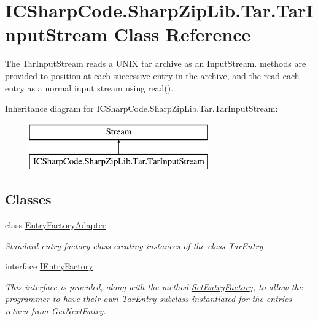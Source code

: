 \hypertarget{class_i_c_sharp_code_1_1_sharp_zip_lib_1_1_tar_1_1_tar_input_stream}{}\section{I\+C\+Sharp\+Code.\+Sharp\+Zip\+Lib.\+Tar.\+Tar\+Input\+Stream Class Reference}
\label{class_i_c_sharp_code_1_1_sharp_zip_lib_1_1_tar_1_1_tar_input_stream}


The \hyperlink{class_i_c_sharp_code_1_1_sharp_zip_lib_1_1_tar_1_1_tar_input_stream}{Tar\+Input\+Stream} reads a U\+N\+IX tar archive as an Input\+Stream. methods are provided to position at each successive entry in the archive, and the read each entry as a normal input stream using read().  


Inheritance diagram for I\+C\+Sharp\+Code.\+Sharp\+Zip\+Lib.\+Tar.\+Tar\+Input\+Stream\+:\begin{figure}[H]
\begin{center}
\leavevmode
\includegraphics[height=2.000000cm]{class_i_c_sharp_code_1_1_sharp_zip_lib_1_1_tar_1_1_tar_input_stream}
\end{center}
\end{figure}
\subsection*{Classes}
\begin{DoxyCompactItemize}
\item 
class \hyperlink{class_i_c_sharp_code_1_1_sharp_zip_lib_1_1_tar_1_1_tar_input_stream_1_1_entry_factory_adapter}{Entry\+Factory\+Adapter}
\begin{DoxyCompactList}\small\item\em Standard entry factory class creating instances of the class \hyperlink{class_i_c_sharp_code_1_1_sharp_zip_lib_1_1_tar_1_1_tar_entry}{Tar\+Entry} \end{DoxyCompactList}\item 
interface \hyperlink{interface_i_c_sharp_code_1_1_sharp_zip_lib_1_1_tar_1_1_tar_input_stream_1_1_i_entry_factory}{I\+Entry\+Factory}
\begin{DoxyCompactList}\small\item\em This interface is provided, along with the method \hyperlink{class_i_c_sharp_code_1_1_sharp_zip_lib_1_1_tar_1_1_tar_input_stream_a9d78240fd9fa35d7855939ab89c84e47}{Set\+Entry\+Factory}, to allow the programmer to have their own \hyperlink{class_i_c_sharp_code_1_1_sharp_zip_lib_1_1_tar_1_1_tar_entry}{Tar\+Entry} subclass instantiated for the entries return from \hyperlink{class_i_c_sharp_code_1_1_sharp_zip_lib_1_1_tar_1_1_tar_input_stream_ad1c9380146d8de1f637e7a41868b765d}{Get\+Next\+Entry}. \end{DoxyCompactList}\end{DoxyCompactItemize}
